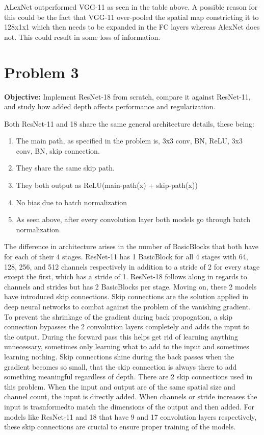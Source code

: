 \documentclass[a4paper]{article}
\begin{document}
ALexNet outperformed VGG-11 as seen in the table above. A possible reason for this could be the fact that VGG-11 over-pooled the spatial map constricting it to 128x1x1 which then needs to be expanded in the FC layers whereas AlexNet does not. This could result in some loss of information.

\section*{\textbf{Problem 3}}

\textbf{Objective:} Implement ResNet-18 from scratch, compare it against ResNet-11, and study how added depth affects performance and regularization.

Both ResNet-11 and 18 share the same general architecture details, these being:
\begin{enumerate}
    \item The main path, as specified in the problem is, 3x3 conv, BN, ReLU, 3x3 conv, BN, skip connection.
    \item They share the same skip path.
    \item They both output as ReLU(main-path(x) + skip-path(x))
    \item No bias due to batch normalization
    \item As seen above, after every convolution layer both models go through batch normalization.
\end{enumerate}

The difference in architecture arises in the number of BasicBlocks that both have for each of their 4 stages. ResNet-11 has 1 BasicBlock for all 4 stages with 64, 128, 256, and 512 channels respectively in addition to a stride of 2 for every stage except the first, which has a stride of 1. ResNet-18 follows along in regards to channels and strides but has 2 BasicBlocks per stage.
Moving on, these 2 models have introduced skip connections. Skip connections are the solution applied in deep neural networks to combat against the problem of the vanishing gradient. To prevent the shrinkage of the gradient during back propogation, a skip connection bypasses the 2 convolution layers completely and adds the input to the output. During the forward pass this helps get rid of learning anything unnecessary, sometimes only learning what to add to the input and sometimes learning nothing. Skip connections shine during the back passes when the gradient becomes so small, that the skip connection is always there to add something meaningful regardless of depth. There are 2 skip connections used in this problem. When the input and output are of the same spatial size and channel count, the input is directly added. When channels or stride increases the input is trasnformedto match the dimensions of the output and then added. For models like ResNet-11 and 18 that have 9 and 17 convolution layers respectively, these skip connections are crucial to ensure proper training of the models.
\end{document}
